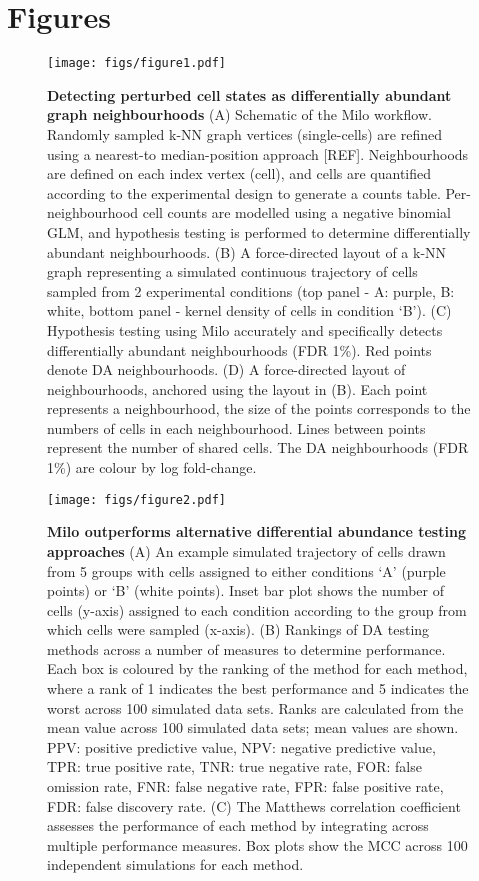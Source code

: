 \documentclass[
  10pt,
]{article}
\author{}
\date{\vspace{-2.5em}}
\begin{document}
\hypertarget{figures}{%
\section*{Figures}\label{figures}}

\begin{figure}
\centering
\texttt{[image: figs/figure1.pdf]}
\caption{\label{fig:fig-1}\textbf{Detecting perturbed cell states as differentially abundant graph neighbourhoods}
(A) Schematic of the Milo workflow. Randomly sampled k-NN graph vertices (single-cells) are refined using a nearest-to median-position approach {[}REF{]}. Neighbourhoods are defined on each index vertex (cell), and cells are quantified according to the experimental design to generate a counts table. Per-neighbourhood cell counts are modelled using a negative binomial GLM, and hypothesis testing is performed to determine differentially abundant neighbourhoods.
(B) A force-directed layout of a k-NN graph representing a simulated continuous trajectory of cells sampled from 2 experimental conditions (top panel - A: purple, B: white, bottom panel - kernel density of cells in condition `B').
(C) Hypothesis testing using Milo accurately and specifically detects differentially abundant neighbourhoods (FDR 1\%). Red points denote DA neighbourhoods.
(D) A force-directed layout of neighbourhoods, anchored using the layout in (B). Each point represents a neighbourhood, the size of the points corresponds to the numbers of cells in each neighbourhood. Lines between points represent the number of shared cells. The DA neighbourhoods (FDR 1\%) are colour by log fold-change.}
\end{figure}







\begin{figure}
\centering
\texttt{[image: figs/figure2.pdf]}
\caption{\label{fig:fig-2}\textbf{Milo outperforms alternative differential abundance testing approaches}
(A) An example simulated trajectory of cells drawn from 5 groups with cells assigned to either conditions `A' (purple points) or `B' (white points). Inset bar plot shows the number of cells (y-axis) assigned to each condition according to the group from which cells were sampled (x-axis).
(B) Rankings of DA testing methods across a number of measures to determine performance. Each box is coloured by the ranking of the method for each method, where a rank of 1 indicates the best performance and 5 indicates the worst across 100 simulated data sets. Ranks are calculated from the mean value across 100 simulated data sets; mean values are shown. PPV: positive predictive value, NPV: negative predictive value, TPR: true positive rate, TNR: true negative rate, FOR: false omission rate, FNR: false negative rate, FPR: false positive rate, FDR: false discovery rate.
(C) The Matthews correlation coefficient assesses the performance of each method by integrating across multiple performance measures. Box plots show the MCC across 100 independent simulations for each method.}
\end{figure}
\end{document}
